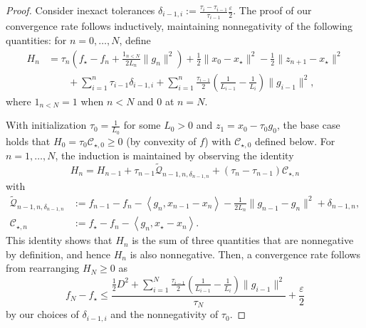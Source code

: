 \documentclass[11pt, hidelinks]{article}
\numberwithin{equation}{section}
\theoremstyle{thmstyletwo}%
\numberwithin{equation}{section}
\newcommand{\eps}{\varepsilon}
\newcommand{\inner}[2]{\left\langle {#1}, {#2} \right\rangle}
\begin{document}
\begin{proof}
Consider inexact tolerances $\delta_{i-1,i}:=\frac{\tau_{i}-\tau_{i-1}}{\tau_{i-1}}\frac{\eps}{2}$. The proof of our convergence rate follows inductively, maintaining nonnegativity of the following quantities: for $n=0,\dots,N$, define
\begin{align*}H_n &= \tau_n(f_\star-f_n+\frac{1_{n < N}}{2L_n}\|g_n\|^2)+\frac{1}{2}\|x_0-x_\star\|^2-\frac{1}{2}\|z_{n+1}-x_\star\|^2 \\ &\qquad+\sum_{i=1}^n \tau_{i-1}\delta_{i-1,i}+\sum_{i=1}^{n} \frac{\tau_{i-1}}{2}\left(\frac{1}{L_{i-1}}-\frac{1}{L_{i}}\right)\|g_{i-1}\|^2, \end{align*}
where $1_{n < N} = 1$ when $n < N$ and $0$ at $n=N$. 

With initialization $\tau_0=\frac{1}{L_0}$ for some $L_0 > 0$ and $z_1 = x_0-\tau_0g_0$, the base case holds that $H_0 = \tau_0 \mathcal{C}_{\star,0} \geq 0$ (by convexity of $f$) with $\mathcal{C}_{\star, 0}$ defined below. For $n=1,\dots,N$, the induction is maintained by observing the identity
$$H_{n}=H_{n-1}+\tau_{n-1}\tilde{\mathcal{Q}}_{n-1,n,\delta_{n-1,n}}+(\tau_n-\tau_{n-1})\mathcal{C}_{\star,n}$$
with
\begin{align*}\tilde{\mathcal{Q}}_{n-1,n,\delta_{n-1,n}} &:= f_{n-1}-f_n - \inner{g_n}{x_{n-1}-x_n}-\frac{1}{2L_n}\|g_{n-1}-g_n\|^2 + \delta_{n-1,n},\\
\mathcal{C}_{\star, n} &:= f_\star - f_n - \inner{g_n}{x_\star - x_n}.\end{align*}
This identity shows that $H_n$ is the sum of three quantities that are nonnegative by definition, and hence $H_n$ is also nonnegative. Then, a convergence rate follows from rearranging $H_N\geq 0$ as
\begin{equation}\label{eq:OBL bound}f_N-f_\star \leq \frac{\frac{1}{2}D^2 + \sum_{i=1}^N \frac{\tau_{i-1}}{2}\left(\frac{1}{L_{i-1}}-\frac{1}{L_i}\right)\|g_{i-1}\|^2 }{\tau_N}+\frac{\eps}{2}\end{equation}
by our choices of $\delta_{i-1,i}$ and the nonnegativity of $\tau_0$.


\end{proof}
\end{document}
